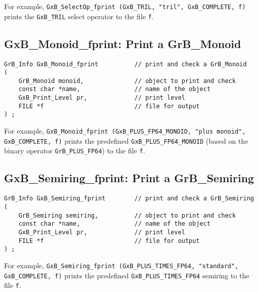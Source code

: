 \documentclass[12pt]{article}
\begin{document}
For example,
\verb'GxB_SelectOp_fprint (GxB_TRIL, "tril", GxB_COMPLETE, f)' prints the
\verb'GxB_TRIL' select operator to the file \verb'f'.

\newpage
\subsection{{\sf GxB\_Monoid\_fprint:} Print a {\sf GrB\_Monoid}}

\begin{mdframed}[userdefinedwidth=6in]
{\footnotesize
\begin{verbatim}
GrB_Info GxB_Monoid_fprint          // print and check a GrB_Monoid
(
    GrB_Monoid monoid,              // object to print and check
    const char *name,               // name of the object
    GxB_Print_Level pr,             // print level
    FILE *f                         // file for output
) ;
\end{verbatim} } \end{mdframed}

For example,
\verb'GxB_Monoid_fprint (GxB_PLUS_FP64_MONOID, "plus monoid",'
\verb'GxB_COMPLETE, f)'
prints the predefined \verb'GxB_PLUS_FP64_MONOID' (based on the binary
operator \verb'GrB_PLUS_FP64') to the file \verb'f'.

\subsection{{\sf GxB\_Semiring\_fprint:} Print a {\sf GrB\_Semiring}}

\begin{mdframed}[userdefinedwidth=6in]
{\footnotesize
\begin{verbatim}
GrB_Info GxB_Semiring_fprint        // print and check a GrB_Semiring
(
    GrB_Semiring semiring,          // object to print and check
    const char *name,               // name of the object
    GxB_Print_Level pr,             // print level
    FILE *f                         // file for output
) ;
\end{verbatim} } \end{mdframed}

For example,
\verb'GxB_Semiring_fprint (GxB_PLUS_TIMES_FP64, "standard",'
\verb'GxB_COMPLETE, f)'
prints the predefined \verb'GxB_PLUS_TIMES_FP64' semiring to the file \verb'f'.
\end{document}
